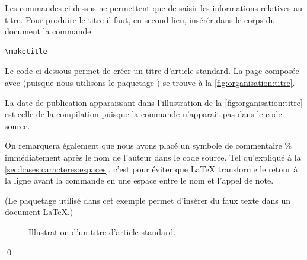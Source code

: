 Les commandes ci-dessus ne permettent que de saisir les informations
relatives au titre. Pour produire le titre il faut, en second lieu,
insérér dans le corps du document la commande
\begin{lstlisting}
\maketitle
\end{lstlisting}

\begin{exemple}
  \label{ex:organisation:titre}
  Le code ci-dessous permet de créer un titre d'article standard. La
  page composée avec {\XeLaTeX} (puisque nous utilisons le paquetage
  ) se trouve à la \autoref{fig:organisation:titre}.
  \begin{demo}
    
  \end{demo}

  La date de publication apparaissant dans l'illustration de la
  \autoref*{fig:organisation:titre} est celle de la compilation
  puisque la commande \cmdprint{\date} n'apparait pas dans le code
  source.

  On remarquera également que nous avons placé un symbole de
  commentaire \% immédiatement après le nom de l'auteur dans le code
  source. Tel qu'expliqué à la \ref{sec:bases:caracteres:espaces},
  c'est pour éviter que {\LaTeX} transforme le retour à la ligne avant
  la commande \cmd{\thanks} en une espace entre le nom et l'appel de
  note.

  (Le paquetage  utilisé dans cet exemple permet
  d'insérer du faux texte 
  dans un document \LaTeX.)
  \begin{figure}
    \centering
    \caption{Illustration d'un titre d'article standard.}
    \label{fig:organisation:titre}
  \end{figure}
  \qed
\end{exemple}

